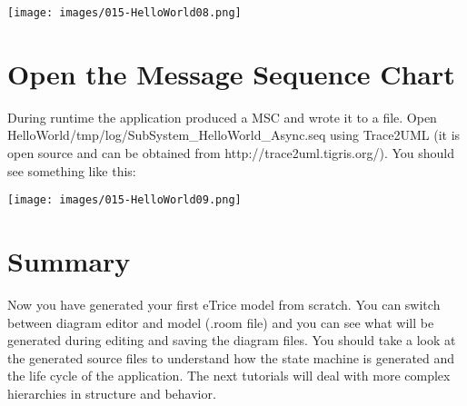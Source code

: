 \texttt{[image: images/015-HelloWorld08.png]}

\section{Open the Message Sequence Chart}

During runtime the application produced a MSC and wrote it to a file. Open HelloWorld/tmp/log/SubSystem\_HelloWorld\_Async.seq using Trace2UML (it is open source and can be obtained from  http://trace2uml.tigris.org/). You should see something like this:

\texttt{[image: images/015-HelloWorld09.png]}


\section{Summary}

Now you have generated your first eTrice model from scratch. You can switch between diagram editor and model (.room file) and you can see what will be generated during editing and saving the diagram files. 
You should take a look at the generated source files to understand how the state machine is generated and the life cycle of the application. The next tutorials will deal with more complex hierarchies in structure and behavior.
